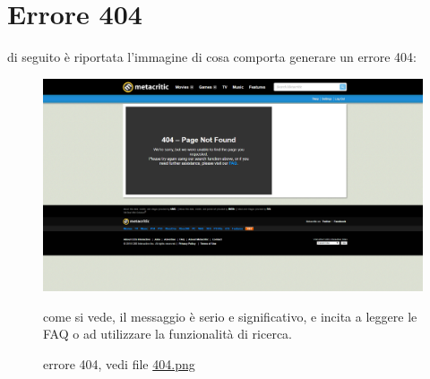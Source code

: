 \documentclass[12pt]{article}
\begin{document}
\section{Errore 404}
di seguito è riportata l'immagine di cosa comporta generare un errore 404:\\
\begin{figure}[H]
	\begin{center}
		\includegraphics[width=13.5cm]{404.png}
		\caption{errore 404, vedi file \href{404.png}{404.png}}
	\end{center}
	come si vede, il messaggio è serio e significativo, e incita a leggere le FAQ o ad utilizzare la funzionalità di ricerca.
\end{figure}
\newpage
\end{document}
